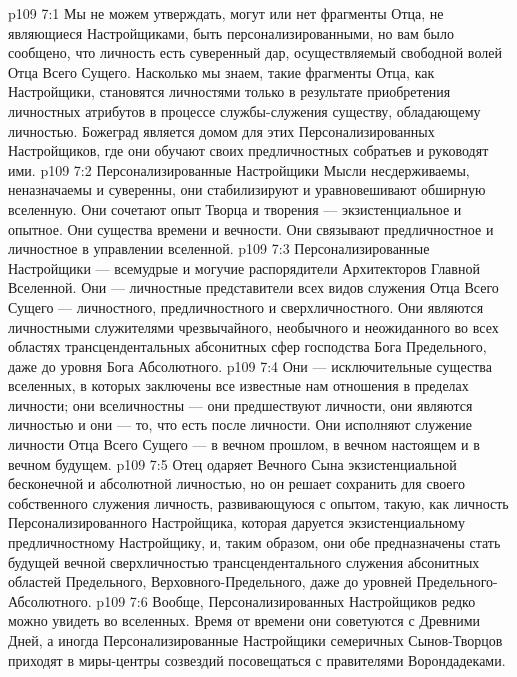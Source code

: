 \vs p109 7:1 Мы не можем утверждать, могут или нет фрагменты Отца, не являющиеся Настройщиками, быть персонализированными, но вам было сообщено, что личность есть суверенный дар, осуществляемый свободной волей Отца Всего Сущего. Насколько мы знаем, такие фрагменты Отца, как Настройщики, становятся личностями только в результате приобретения личностных атрибутов в процессе службы\hyp{}служения существу, обладающему личностью. Божеград является домом для этих Персонализированных Настройщиков, где они обучают своих предличностных собратьев и руководят ими.
\vs p109 7:2 Персонализированные Настройщики Мысли несдерживаемы, неназначаемы и суверенны, они стабилизируют и уравновешивают обширную вселенную. Они сочетают опыт Творца и творения --- экзистенциальное и опытное. Они существа времени и вечности. Они связывают предличностное и личностное в управлении вселенной.
\vs p109 7:3 Персонализированные Настройщики --- всемудрые и могучие распорядители Архитекторов Главной Вселенной. Они --- личностные представители всех видов служения Отца Всего Сущего --- личностного, предличностного и сверхличностного. Они являются личностными служителями чрезвычайного, необычного и неожиданного во всех областях трансцендентальных абсонитных сфер господства Бога Предельного, даже до уровня Бога Абсолютного.
\vs p109 7:4 Они --- исключительные существа вселенных, в которых заключены все известные нам отношения в пределах личности; они вселичностны --- они предшествуют личности, они являются личностью и они --- то, что есть после личности. Они исполняют служение личности Отца Всего Сущего --- в вечном прошлом, в вечном настоящем и в вечном будущем.
\vs p109 7:5 Отец одаряет Вечного Сына экзистенциальной бесконечной и абсолютной личностью, но он решает сохранить для своего собственного служения личность, развивающуюся с опытом, такую, как личность Персонализированного Настройщика, которая даруется экзистенциальному предличностному Настройщику, и, таким образом, они обе предназначены стать будущей вечной сверхличностью трансцендентального служения абсонитных областей Предельного, Верховного\hyp{}Предельного, даже до уровней Предельного\hyp{}Абсолютного.
\vs p109 7:6 Вообще, Персонализированных Настройщиков редко можно увидеть во вселенных. Время от времени они советуются с Древними Дней, а иногда Персонализированные Настройщики семеричных Сынов\hyp{}Творцов приходят в миры\hyp{}центры созвездий посовещаться с правителями Ворондадеками.
